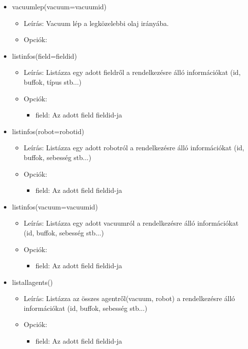 \begin{itemize}
     \item vacuumlep(vacuum=vacuumid)
     \begin{itemize}
        	\item Leírás: Vacuum lép a legközelebbi olaj irányába.
        	\item Opciók: 
     \end{itemize}    
     
    \item listinfos(field=fieldid)
    \begin{itemize}
    	\item Leírás: Listázza egy adott fieldről a rendelkezésre álló információkat (id, buffok, típus stb...)
    	\item Opciók: 
    	\begin{itemize}
    		\item field: Az adott field fieldid-ja
    	\end{itemize}	
    \end{itemize}      
         
    \item listinfos(robot=robotid)
    \begin{itemize}
    	\item Leírás: Listázza egy adott robotról a rendelkezésre álló információkat (id, buffok, sebesség stb...)
    	\item Opciók: 
    	\begin{itemize}
    		\item field: Az adott field fieldid-ja
    	\end{itemize}	
    \end{itemize} 
    
    \item listinfos(vacuum=vacuumid)
    \begin{itemize}
    	\item Leírás: Listázza egy adott vacuumról a rendelkezésre álló információkat (id, buffok, sebesség stb...)
    	\item Opciók: 
    	\begin{itemize}
    		\item field: Az adott field fieldid-ja
    	\end{itemize}	
    \end{itemize}     
    
    \item listallagents()
    \begin{itemize}
    	\item Leírás: Listázza az összes agentről(vacuum, robot) a rendelkezésre álló információkat (id, buffok, sebesség stb...)
    	\item Opciók: 
    	\begin{itemize}
    		\item field: Az adott field fieldid-ja
    	\end{itemize}	
    \end{itemize}    
    

\end{itemize}
